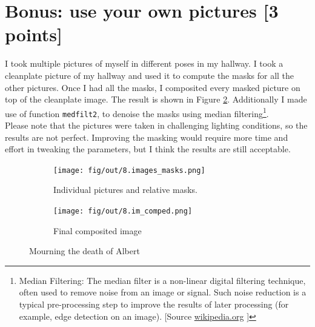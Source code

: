 \documentclass[tikz,14pt,fleqn]{article}
\begin{document}
\section{Bonus: use your own pictures [3 points]}
I took multiple pictures of myself in different poses in my hallway. I took a cleanplate picture of my hallway and used it to compute the masks for all the other pictures. Once I had all the masks, I composited every masked picture on top of the cleanplate image. The result is shown in Figure \ref{fig:8.mourning}. Additionally I made use of function \texttt{medfilt2}, to denoise the masks using median filtering\footnote{Median Filtering: The median filter is a non-linear digital filtering technique, often used to remove noise from an image or signal. Such noise reduction is a typical pre-processing step to improve the results of later processing (for example, edge detection on an image). [Source \href{https://en.wikipedia.org/wiki/Median_filter}{wikipedia.org} ]}. \\Please note that the pictures were taken in challenging lighting conditions, so the results are not perfect. Improving the masking would require more time and effort in tweaking the parameters, but I think the results are still acceptable.
\begin{figure}[h!]
    \centering
    \begin{subfigure}{.69\textwidth}
        \centering
        \texttt{[image: fig/out/8.images\_masks.png]}
        \caption{Individual pictures and relative masks.}
    \end{subfigure}
    \begin{subfigure}{0.3\textwidth}
        \centering
        \texttt{[image: fig/out/8.im\_comped.png]}
        \caption{Final composited image}
        \label{fig:8.mourning}
    \end{subfigure}
    \caption{Mourning the death of Albert}

\end{figure}
\end{document}
